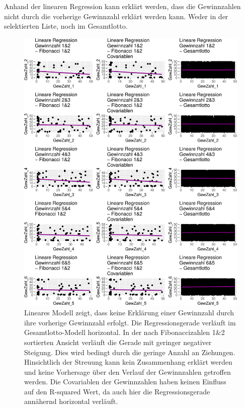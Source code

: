 \documentclass[ngerman,]{article}
\begin{document}
Anhand der linearen Regression kann erklärt werden, dass die
Gewinnzahlen nicht durch die vorherige Gewinnzahl erklärt werden kann.
Weder in der selektierten Liste, noch im Gesamtlotto.

\begin{figure}

\includegraphics{Abbildung/ergebnis_linear-1} \hfill{}

\caption{Lineares Modell zeigt, dass keine Erklärung einer Gewinnzahl durch ihre vorherige Gewinnzahl erfolgt. Die Regressionsgerade verläuft im Gesamtlotto-Modell horizontal. In der nach Fibonaccizahlen 1\&2 sortierten Ansicht verläuft die Gerade mit geringer negativer Steigung. Dies wird bedingt durch die geringe Anzahl an Ziehungen. Hinsichtlich der Streuung kann kein Zusammenhang erklärt werden und keine Vorhersage über den Verlauf der Gewinnzahlen getroffen werden. Die Covariablen der Gewinnzahlen haben keinen Einfluss auf den R-squared Wert, da auch hier die Regressionsgerade annähernd horizontal verläuft.}\label{fig:ergebnis_linear}
\end{figure}
\end{document}
